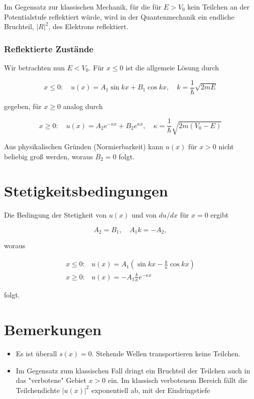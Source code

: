 \documentclass[10pt, letterpaper]{article}
\begin{document}
Im Gegensatz zur klassischen Mechanik, für die für $E>V_{0}$ kein Teilchen an der Potentialstufe reflektiert würde, wird in der Quantenmechanik ein endliche Bruchteil, $|R|^{2}$, des Elektrons reflektiert.

\subsubsection*{Reflektierte Zustände}
Wir betrachten nun $E<V_{0}$. Für $x \leq 0$ ist die allgemeie Lösung durch

$$
x \leq 0: \quad u(x)=A_{1} \sin k x+B_{1} \cos k x, \quad k=\frac{1}{\hbar} \sqrt{2 m E}
$$

gegeben, für $x \geq 0$ analog durch

$$
x \geq 0: \quad u(x)=A_{2} e^{-\kappa x}+B_{2} e^{\kappa x}, \quad \kappa=\frac{1}{\hbar} \sqrt{2 m\left(V_{0}-E\right)}
$$

Aus physikalischen Gründen (Normierbarkeit) kann $u(x)$ für $x>0$ nicht beliebig groß werden, woraus $B_{2}=0$ folgt.

\section*{Stetigkeitsbedingungen}
Die Bedingung der Stetigkeit von $u(x)$ und von $d u / d x$ für $x=0$ ergibt

$$
A_{2}=B_{1}, \quad A_{1} k=-A_{2},
$$

woraus

$$
\begin{array}{ll}
x \leq 0: & u(x)=A_{1}\left(\sin k x-\frac{k}{\kappa} \cos k x\right) \\
x \geq 0: & u(x)=-A_{1} \frac{k}{\kappa} e^{-\kappa x}
\end{array}
$$

folgt.

\section*{Bemerkungen}
\begin{itemize}
  \item Es ist überall $s(x)=0$. Stehende Wellen transportieren keine Teilchen.
  \item Im Gegensatz zum klassischen Fall dringt ein Bruchteil der Teilchen auch in das "verbotene" Gebiet $x>0$ ein. Im klassisch verbotenem Bereich fällt die Teilchendichte $|u(x)|^{2}$ exponentiell ab, mit der Eindringstiefe
\end{itemize}
\end{document}
